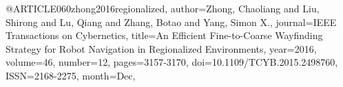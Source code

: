 @ARTICLE{060zhong2016regionalized,
author={Zhong, Chaoliang and Liu, Shirong and Lu, Qiang and Zhang, Botao and Yang, Simon X.},
journal={IEEE Transactions on Cybernetics}, 
title={An Efficient Fine-to-Coarse Wayfinding Strategy for Robot Navigation in Regionalized Environments}, 
year={2016},
volume={46},
number={12},
pages={3157-3170},
doi={10.1109/TCYB.2015.2498760},
ISSN={2168-2275},
month={Dec},}